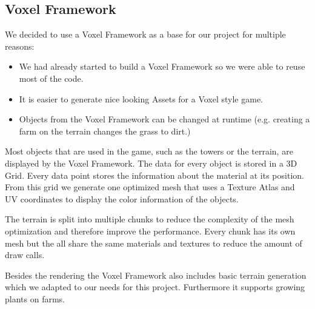\subsection{Voxel Framework}

We decided to use a Voxel Framework as a base for our project for multiple reasons:
\begin{itemize}
	\item We had already started to build a Voxel Framework so we were able to reuse most of the code.
	\item It is easier to generate nice looking Assets for a Voxel style game.
	\item Objects from the Voxel Framework can be changed at runtime (e.g. creating a farm on the terrain changes the grass to dirt.)
\end{itemize}


Most objects that are used in the game, such as the towers or the terrain, are displayed by the Voxel Framework. The data for every object is stored in a 3D Grid. Every data point stores the information about the material at its position. From this grid we generate one optimized mesh that uses a Texture Atlas and UV coordinates to display the color information of the objects. 

The terrain is split into multiple chunks to reduce the complexity of the mesh optimization and therefore improve the performance. Every chunk has its own mesh but the all share the same materials and textures to reduce the amount of draw calls.

Besides the rendering the Voxel Framework also includes basic terrain generation which we adapted to our needs for this project. Furthermore it supports growing plants on farms.